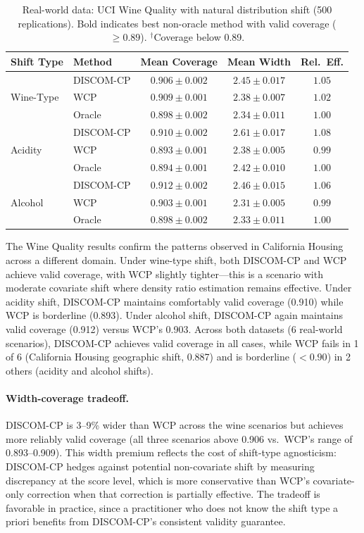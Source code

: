 \documentclass{article}
\newcommand{\DISCOM}{\textsc{DISCOM-CP}}
\begin{document}
\begin{table}[t]
\caption{Real-world data: UCI Wine Quality with natural distribution shift (500 replications). Bold indicates best non-oracle method with valid coverage ($\geq 0.89$). $^\dagger$Coverage below 0.89.}
\label{tab:wine}
\centering
\small
\begin{tabular}{llccc}
\toprule
\textbf{Shift Type} & \textbf{Method} & \textbf{Mean Coverage} & \textbf{Mean Width} & \textbf{Rel.\ Eff.} \\
\midrule
\multirow{3}{*}{Wine-Type} & \DISCOM{} & $\mathbf{0.906 \pm 0.002}$ & $\mathbf{2.45 \pm 0.017}$ & $\mathbf{1.05}$ \\
& WCP & $0.909 \pm 0.001$ & $2.38 \pm 0.007$ & $1.02$ \\
& Oracle & $0.898 \pm 0.002$ & $2.34 \pm 0.011$ & $1.00$ \\
\midrule
\multirow{3}{*}{Acidity} & \DISCOM{} & $\mathbf{0.910 \pm 0.002}$ & $\mathbf{2.61 \pm 0.017}$ & $\mathbf{1.08}$ \\
& WCP & $0.893 \pm 0.001$ & $2.38 \pm 0.005$ & $0.99$ \\
& Oracle & $0.894 \pm 0.001$ & $2.42 \pm 0.010$ & $1.00$ \\
\midrule
\multirow{3}{*}{Alcohol} & \DISCOM{} & $\mathbf{0.912 \pm 0.002}$ & $\mathbf{2.46 \pm 0.015}$ & $\mathbf{1.06}$ \\
& WCP & $0.903 \pm 0.001$ & $2.31 \pm 0.005$ & $0.99$ \\
& Oracle & $0.898 \pm 0.002$ & $2.33 \pm 0.011$ & $1.00$ \\
\bottomrule
\end{tabular}
\end{table}

The Wine Quality results confirm the patterns observed in California Housing across a different domain. Under wine-type shift, both \DISCOM{} and WCP achieve valid coverage, with WCP slightly tighter---this is a scenario with moderate covariate shift where density ratio estimation remains effective. Under acidity shift, \DISCOM{} maintains comfortably valid coverage (0.910) while WCP is borderline (0.893). Under alcohol shift, \DISCOM{} again maintains valid coverage (0.912) versus WCP's 0.903. Across both datasets (6 real-world scenarios), \DISCOM{} achieves valid coverage in all cases, while WCP fails in 1 of 6 (California Housing geographic shift, 0.887) and is borderline ($< 0.90$) in 2 others (acidity and alcohol shifts).

\paragraph{Width-coverage tradeoff.} \DISCOM{} is 3--9\% wider than WCP across the wine scenarios but achieves more reliably valid coverage (all three scenarios above 0.906 vs.\ WCP's range of 0.893--0.909). This width premium reflects the cost of shift-type agnosticism: \DISCOM{} hedges against potential non-covariate shift by measuring discrepancy at the score level, which is more conservative than WCP's covariate-only correction when that correction is partially effective. The tradeoff is favorable in practice, since a practitioner who does not know the shift type a priori benefits from \DISCOM{}'s consistent validity guarantee.
\end{document}
